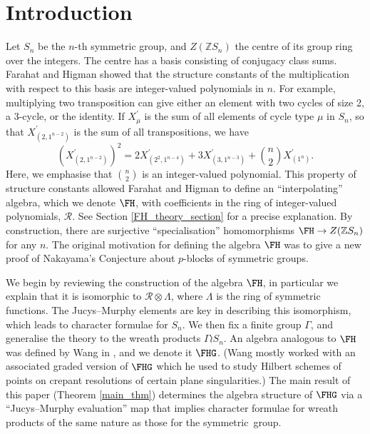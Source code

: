 \section{Introduction}
Let $S_n$ be the $n$-th symmetric group, and $Z(\mathbb{Z}S_n)$ the centre of its group ring over the integers. The centre has a basis consisting of conjugacy class sums. Farahat and Higman \cite{FarahatHigman} showed that the structure constants of the multiplication with respect to this basis are integer-valued polynomials in $n$. For example, multiplying two transposition can give either an element with two cycles of size 2, a 3-cycle, or the identity. If $X_\mu^\prime$ is the sum of all elements of cycle type $\mu$ in $S_n$, so that $X_{(2,1^{n-2})}^\prime$ is the sum of all transpositions, we have
\begin{equation}
(X_{(2,1^{n-2})}^\prime)^2 = 2X_{(2^2,1^{n-4})}^\prime + 3X_{(3,1^{n-3})}^\prime + \binom{n}{2}X_{(1^{n})}^\prime.
\end{equation}
Here, we emphasise that $\binom{n}{2}$ is an integer-valued polynomial. This property of structure constants allowed Farahat and Higman to define an ``interpolating'' algebra, which we denote $\FH$, with coefficients in the ring of integer-valued polynomials, $\mathcal{R}$. See Section \ref{FH_theory_section} for a precise explanation. By construction, there are surjective ``specialisation'' homomorphisms $\FH \to Z(\mathbb{Z}S_n)$ for any $n$. The original motivation for defining the algebra $\FH$ was to give a new proof of Nakayama's Conjecture about $p$-blocks of symmetric groups.

We begin by reviewing the construction of the algebra $\FH$, in particular we explain that it is isomorphic to $\mathcal{R} \otimes \Lambda$, where $\Lambda$ is the ring of symmetric functions. The Jucys--Murphy elements are key in describing this isomorphism, which leads to character formulae for $S_n$. We then fix a finite group $\Gamma$, and generalise the theory to the wreath products $\Gamma \wr S_n$. An algebra analogous to $\FH$ was defined by Wang in \cite{Wang1}, and we denote it $\FHG$. (Wang mostly worked with an associated graded version of $\FHG$ which he used to study Hilbert schemes of points on crepant resolutions of certain plane singularities.) The main result of this paper (Theorem \ref{main_thm}) determines the algebra structure of $\FHG$ via a ``Jucys--Murphy evaluation'' map that implies character formulae for wreath products of the same nature as those for the symmetric~group.

